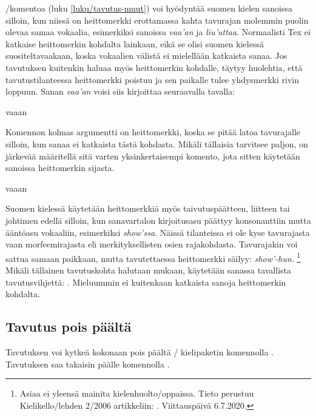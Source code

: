 \noindent
{}\-/komentoa (luku \ref{luku/tavutus-muut}) voi
hyödyntää suomen kielen sanoissa silloin, kun niissä on heittomerkki
erottamassa kahta tavurajan molemmin puolin olevaa samaa vokaalia,
esimerkiksi sanoissa \emph{vaa'an} ja \emph{liu'uttaa}. Normaalisti Tex
ei katkaise heittomerkin kohdalta lainkaan, eikä se olisi suomen
kielessä suositeltavaakaan, koska vokaalien välistä ei mielellään
katkaista sanaa. Jos tavutuksen kuitenkin haluaa myös heittomerkin
kohdalle, täytyy huolehtia, että tavutustilanteessa heittomerkki poistuu
ja sen paikalle tulee yhdysmerkki rivin loppuun. Sanan \emph{vaa'an}
voisi siis kirjoittaa seuraavalla tavalla:

\begin{koodilohkosis}
vaaan
\end{koodilohkosis}

\noindent
Komennon kolmas argumentti on heittomerkki, koska se pitää latoa
tavurajalle silloin, kun sanaa ei katkaista tästä kohdasta. Mikäli
tällaisia tarvitsee paljon, on järkevää määritellä sitä varten
yksinkertaisempi komento, jota sitten käytetään sanoissa heittomerkin
sijasta.

\begin{koodilohkosis}
\newcommand{\hm}{}
vaa\hm an
\end{koodilohkosis}

\noindent
Suomen kielessä käytetään heittomerkkiä myös taivutuspäätteen, liitteen
tai johtimen edellä silloin, kun sanavartalon kirjoitusasu päättyy
konsonanttiin mutta ääntöasu vokaaliin, esimerkiksi \emph{show'ssa}.
Näissä tilanteissa ei ole kyse tavurajasta vaan morfeemirajasta eli
merkityksellisten osien rajakohdasta. Tavurajakin voi sattua samaan
paikkaan, mutta tavutettaessa heittomerkki säilyy: \emph{show'-hun}.%
\footnote{Asiaa ei yleensä mainita kielenhuolto\-/oppaissa. Tieto
  perustuu Kielikello\-/lehden 2/2006 artikkeliin:
  . Viittauspäivä
  6.7.2020.} Mikäli tällainen tavutuskohta halutaan mukaan, käytetään
sanassa tavallista tavutusvihjettä: \komento{-}.
Mieluummin ei kuitenkaan katkaista sanoja heittomerkin kohdalta.

\subsection{Tavutus pois päältä}

Tavutuksen voi kytkeä kokonaan pois päältä \-/
kielipaketin komennolla . Tavutuksen saa
takaisin päälle komennolla .


